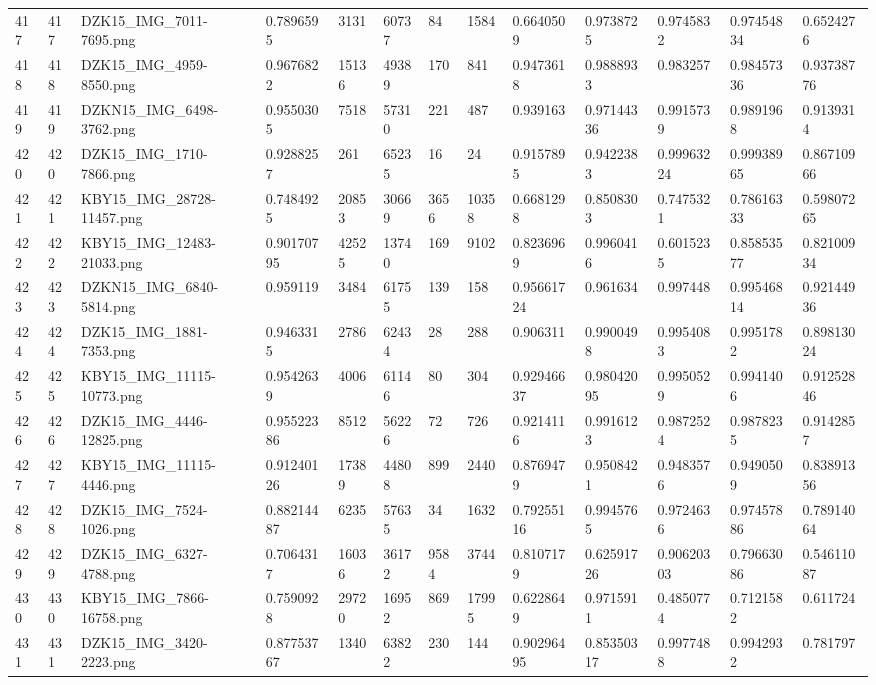 \documentclass[11pt, a4paper, twoside]{report}
\begin{document}
\begin{longtable}[c]{@{}lllllllllllll@{}}
417 & 417 & DZK15\_IMG\_7011-7695.png & 0.7896595 & 3131 & 60737 & 84 & 1584 & 0.6640509 & 0.9738725 & 0.9745832 & 0.97454834 & 0.6524276 \\
418 & 418 & DZK15\_IMG\_4959-8550.png & 0.9676822 & 15136 & 49389 & 170 & 841 & 0.9473618 & 0.9888933 & 0.983257 & 0.98457336 & 0.93738776 \\
419 & 419 & DZKN15\_IMG\_6498-3762.png & 0.9550305 & 7518 & 57310 & 221 & 487 & 0.939163 & 0.97144336 & 0.9915739 & 0.9891968 & 0.9139314 \\
420 & 420 & DZK15\_IMG\_1710-7866.png & 0.9288257 & 261 & 65235 & 16 & 24 & 0.9157895 & 0.9422383 & 0.99963224 & 0.99938965 & 0.86710966 \\
421 & 421 & KBY15\_IMG\_28728-11457.png & 0.7484925 & 20853 & 30669 & 3656 & 10358 & 0.6681298 & 0.8508303 & 0.7475321 & 0.78616333 & 0.59807265 \\
422 & 422 & KBY15\_IMG\_12483-21033.png & 0.90170795 & 42525 & 13740 & 169 & 9102 & 0.8236969 & 0.9960416 & 0.6015235 & 0.85853577 & 0.82100934 \\
423 & 423 & DZKN15\_IMG\_6840-5814.png & 0.959119 & 3484 & 61755 & 139 & 158 & 0.95661724 & 0.961634 & 0.997448 & 0.99546814 & 0.92144936 \\
424 & 424 & DZK15\_IMG\_1881-7353.png & 0.9463315 & 2786 & 62434 & 28 & 288 & 0.906311 & 0.9900498 & 0.9954083 & 0.9951782 & 0.89813024 \\
425 & 425 & KBY15\_IMG\_11115-10773.png & 0.9542639 & 4006 & 61146 & 80 & 304 & 0.92946637 & 0.98042095 & 0.9950529 & 0.9941406 & 0.91252846 \\
426 & 426 & DZK15\_IMG\_4446-12825.png & 0.95522386 & 8512 & 56226 & 72 & 726 & 0.9214116 & 0.9916123 & 0.9872524 & 0.9878235 & 0.9142857 \\
427 & 427 & KBY15\_IMG\_11115-4446.png & 0.91240126 & 17389 & 44808 & 899 & 2440 & 0.8769479 & 0.9508421 & 0.9483576 & 0.9490509 & 0.83891356 \\
428 & 428 & DZK15\_IMG\_7524-1026.png & 0.88214487 & 6235 & 57635 & 34 & 1632 & 0.79255116 & 0.9945765 & 0.9724636 & 0.97457886 & 0.78914064 \\
429 & 429 & DZK15\_IMG\_6327-4788.png & 0.7064317 & 16036 & 36172 & 9584 & 3744 & 0.8107179 & 0.62591726 & 0.90620303 & 0.79663086 & 0.54611087 \\
430 & 430 & KBY15\_IMG\_7866-16758.png & 0.7590928 & 29720 & 16952 & 869 & 17995 & 0.6228649 & 0.9715911 & 0.4850774 & 0.7121582 & 0.611724 \\
431 & 431 & DZK15\_IMG\_3420-2223.png & 0.87753767 & 1340 & 63822 & 230 & 144 & 0.90296495 & 0.85350317 & 0.9977488 & 0.9942932 & 0.781797 \\

\end{longtable}
\end{document}
